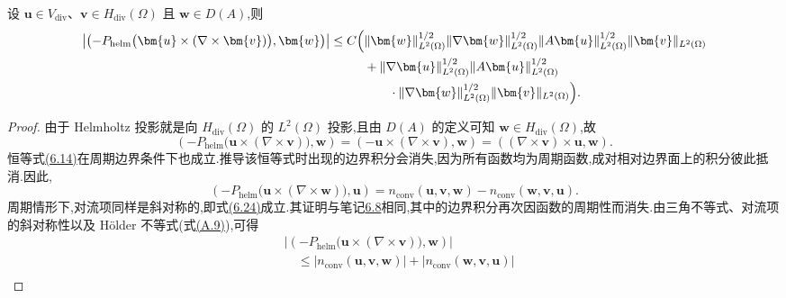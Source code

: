 \begin{lemma}[对流项的估计]
\label{lem:navier-stokes-alpha-convection-estimate}
设 $\bm{u}\in V_{\mathrm{div}}$、$\bm{v}\in H_{\mathrm{div}}(\Omega)$ 且 $\bm{w}\in D(A)$,则
\begin{equation}\label{eq:navier-stokes-alpha-convection-estimate}
\begin{aligned}
 \left|\left(-P_{\mathrm{helm}}
   \bigl(\bm{u}\times(\nabla\times\bm{v})\bigr),
   \bm{w}\right)\right|
 \le C\Bigl(&
  \|\bm{w}\|_{L^2(\Omega)}^{1/2}
  \|\nabla\bm{w}\|_{L^2(\Omega)}^{1/2}
  \|A\bm{u}\|_{L^2(\Omega)}^{1/2}
  \|\bm{v}\|_{L^2(\Omega)}\\
   &+\|\nabla\bm{u}\|_{L^2(\Omega)}^{1/2}
    \|A\bm{u}\|_{L^2(\Omega)}^{1/2}
    \\
   &\qquad\cdot\|\nabla\bm{w}\|_{L^2(\Omega)}^{1/2}
    \|\bm{v}\|_{L^2(\Omega)}\Bigr).
\end{aligned}
\end{equation}
\begin{proof}
由于 Helmholtz 投影就是向 $H_{\mathrm{div}}(\Omega)$ 的 $L^2(\Omega)$ 投影,且由 $D(A)$ 的定义可知 $\bm{w}\in H_{\mathrm{div}}(\Omega)$,故
\[
 \left(-P_{\mathrm{helm}}
    \bigl(\bm{u}\times(\nabla\times\bm{v})\bigr),\bm{w}\right)
 =\left(-\bm{u}\times(\nabla\times\bm{v}),\bm{w}\right)
 =\left((\nabla\times\bm{v})\times\bm{u},\bm{w}\right).
\]
恒等式\hyperref[eq:steady-ns-rot-conv-identity]{(6.14)}在周期边界条件下也成立.推导该恒等式时出现的边界积分会消失,因为所有函数均为周期函数,成对相对边界面上的积分彼此抵消.因此,
\begin{equation}\label{eq:navier-stokes-alpha-convection-identity}
 \left(-P_{\mathrm{helm}}
   \bigl(\bm{u}\times(\nabla\times\bm{w})\bigr),\bm{u}\right)
 =n_{\mathrm{conv}}(\bm{u},\bm{v},\bm{w})
  -n_{\mathrm{conv}}(\bm{w},\bm{v},\bm{u}).
\end{equation}
周期情形下,对流项同样是斜对称的,即式\hyperref[eq:steady-ns-conv-skew]{(6.24)}成立.其证明与笔记\hyperref[note:steady-ns-equivalent-variational-forms]{6.8}相同,其中的边界积分再次因函数的周期性而消失.由三角不等式、对流项的斜对称性以及 Hölder 不等式(式\hyperref[eq:appendix-a-9]{(A.9)}),可得
\begin{equation}\label{eq:navier-stokes-alpha-convection-bound-periodic}
\begin{aligned}
 &\left|\left(-P_{\mathrm{helm}}
   \bigl(\bm{u}\times(\nabla\times\bm{v})\bigr),
   \bm{w}\right)\right|\\
 &\quad\le |n_{\mathrm{conv}}(\bm{u},\bm{v},\bm{w})|
            +|n_{\mathrm{conv}}(\bm{w},\bm{v},\bm{u})|\\

\end{aligned}
\end{equation}
\end{proof}
\end{lemma}
